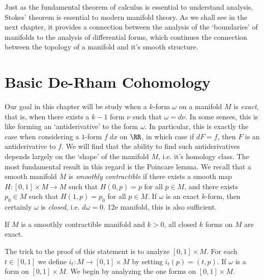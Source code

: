 Just as the fundamental theorem of calculus is essential to understand analysis, Stokes' theorem is essential to modern manifold theory. As we shall see in the next chapter, it provides a connection between the analysis of the `boundaries' of manifolds to the analysis of differential forms, which continues the connection between the topology of a manifold and it's smooth structure.

\section{Basic De-Rham Cohomology}

Our goal in this chapter will be study when a $k$-form $\omega$ on a manifold $M$ is \emph{exact}, that is, when there exists a $k-1$ form $\nu$ such that $\omega = d\nu$. In some senses, this is like forming an `antiderivative' to the form $\omega$. In particular, this is exactly the case when considering a $1$-form $f\; dx$ on $\RR$, in which case if $dF = f$, then $F$ is an antiderivative to $f$. We will find that the ability to find such antiderivatives depends largely on the `shape' of the manifold $M$, i.e. it's homology class. The most fundamental result in this regard is the Poincare lemma. We recall that a smooth manifold $M$ is \emph{smoothly contractible} if there exists a smooth map $H: [0,1] \times M \to M$ such that $H(0,p) = p$ for all $p \in M$, and there exists $p_0 \in M$ such that $H(1,p) = p_0$ for all $p \in M$. If $\omega$ is an exact $k$-form, then certainly $\omega$ is \emph{closed}, i.e. $d\omega = 0$. 12e manifold, this is also sufficient.

\begin{lemma}
    If $M$ is a smoothly contractible manifold and $k > 0$, all closed $k$ forms on $M$ are exact.
\end{lemma}

The trick to the proof of this statement is to analyze $[0,1] \times M$. For each $t \in [0,1]$ we define $i_t: M \to [0,1] \times M$ by setting $i_t(p) = (t,p)$. If $\omega$ is a form on $[0,1] \times M$. We begin by analyzing the one forms on $[0,1] \times M$.

